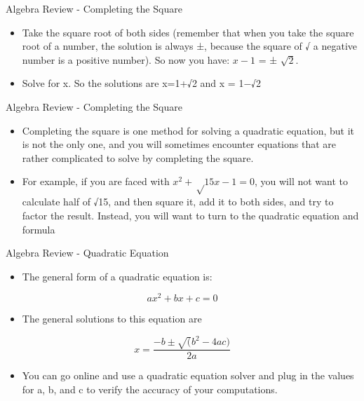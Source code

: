 \documentclass[
  ignorenonframetext,
]{beamer}
\providecommand{\tightlist}{%
  \setlength{\itemsep}{0pt}\setlength{\parskip}{0pt}}
\begin{document}
\begin{frame}{Algebra Review - Completing the Square}
\protect\hypertarget{algebra-review---completing-the-square-2}{}

\begin{itemize}
\item
  Take the square root of both sides (remember that when you take the
  square root of a number, the solution is always ±, because the square
  of √ a negative number is a positive number). So now you have:
  \(x − 1\) = ± \(\sqrt2\).
\item
  Solve for x. So the solutions are x=1+√2 and x = 1−√2
\end{itemize}

\end{frame}

\begin{frame}{Algebra Review - Completing the Square}
\protect\hypertarget{algebra-review---completing-the-square-3}{}

\begin{itemize}
\item
  Completing the square is one method for solving a quadratic equation,
  but it is not the only one, and you will sometimes encounter equations
  that are rather complicated to solve by completing the square.
\item
  For example, if you are faced with \(x^{2} + √15x − 1 = 0\), you will
  not want to calculate half of √15, and then square it, add it to both
  sides, and try to factor the result. Instead, you will want to turn to
  the quadratic equation and formula
\end{itemize}

\end{frame}

\begin{frame}{Algebra Review - Quadratic Equation}
\protect\hypertarget{algebra-review---quadratic-equation}{}

\begin{itemize}
\tightlist
\item
  The general form of a quadratic equation is:
\end{itemize}

\[ax^2 +bx+c=0\]

\begin{itemize}
\tightlist
\item
  The general solutions to this equation are
\end{itemize}

\[x=\frac{−b± \sqrt(b^2−4ac)}{2a}\]

\begin{itemize}
\tightlist
\item
  You can go online and use a quadratic equation solver and plug in the
  values for a, b, and c to verify the accuracy of your computations.
\end{itemize}

\end{frame}
\end{document}
